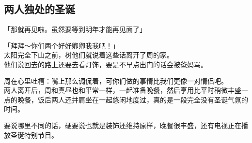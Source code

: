 \subsection{两人独处的圣诞}

「那就再见啦。虽然要等到明年才能再见面了」

「拜拜～你们两个好好卿卿我我吧！」\\

太阳完全下山之前，树他们就说着这些话离开了周的家。\\

他们说回去的路上还要去看灯饰，要是不早点出门的话会被爸妈骂。

周在心里吐槽：嘴上那么调侃着，可你们做的事情比我们更像一对情侣吧。\\

两人离开后，周和真昼也和平常一样，一起准备晚餐，然后享用比平时稍微丰盛一点的晚餐，饭后两人还并肩坐在一起悠闲地度过，真的是一段完全没有圣诞气氛的时间。

要说哪里不同的话，硬要说也就是装饰还维持原样，晚餐很丰盛，还有电视正在播放圣诞特别节目。\\

